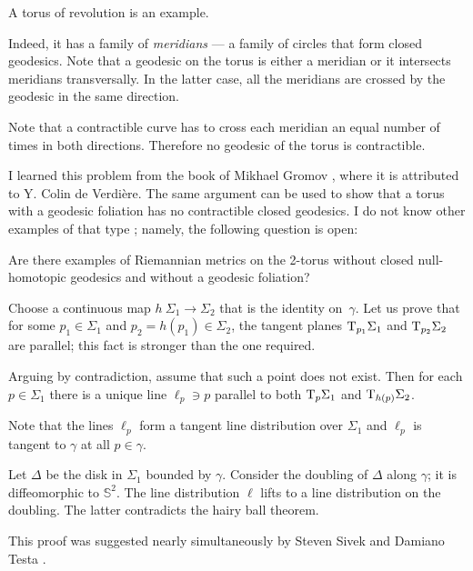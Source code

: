 A torus of revolution is an example.

Indeed, it has a family of {}\emph{meridians} --- a family of circles that form closed geodesics.
Note that a geodesic on the torus is either a meridian
or it intersects meridians transversally.
In the latter case, all the meridians are crossed by the geodesic in the same direction.

Note that a contractible curve has to cross each meridian an equal number of times in both directions.
Therefore no geodesic of the torus is contractible.\qeds 


I learned this problem 
from the book of Mikhael Gromov \cite{gromov-MetStr},
where it is attributed to Y. Colin de Verdi\`ere.
The same argument can be used to show that a torus with a geodesic foliation has no contractible closed geodesics.
I do not know other examples of that type \cite{petrunin-torus}; namely, the following question is open:

\begin{pr}
Are there examples of Riemannian metrics on the 2-torus without closed null-homotopic geodesics and without a geodesic foliation?
\end{pr}


Choose a continuous map $h\:\Sigma_1\to \Sigma_2$
that is the identity on~$\gamma$.
Let us prove that for some $p_1\in \Sigma_1$ and $p_2=h(p_1)\in \Sigma_2$,
the tangent planes $\mathrm{T}_{p_1} \Sigma_1$ and  $\mathrm{T}_{p_2} \Sigma_2$ are parallel;
this fact is stronger than the one required.

\medskip

Arguing by contradiction,
assume that such a point does not exist.
Then for each $p\in\Sigma_1$
there is a unique line $\ell_p\ni p$ 
 parallel to both $\mathrm{T}_{p} \Sigma_1$ and $\mathrm{T}_{h(p)} \Sigma_2$.

Note that the lines $\ell_p$ form a tangent line distribution over $\Sigma_1$
and $\ell_p$ is tangent to $\gamma$ at all $p\in\gamma$.

Let $\Delta$ be the disk in $\Sigma_1$ bounded by $\gamma$.
Consider the doubling of $\Delta$ along  $\gamma$;
it is diffeomorphic to $\mathbb S^2$.
The line distribution $\ell$ lifts to a line distribution on the doubling.
The latter contradicts the hairy ball theorem.\qeds


This proof was suggested nearly simultaneously 
by Steven Sivek 
and Damiano Testa \cite{two-disks}.

